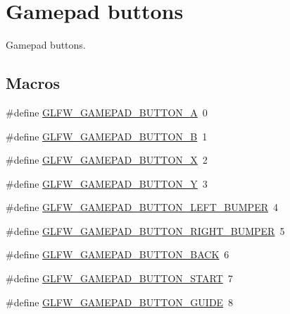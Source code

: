 \hypertarget{group__gamepad__buttons}{}\section{Gamepad buttons}
\label{group__gamepad__buttons}


Gamepad buttons.  


\subsection*{Macros}
\begin{DoxyCompactItemize}
\item 
\#define \mbox{\hyperlink{group__gamepad__buttons_gae055a12fbf4b48b5954c8e1cd129b810}{G\+L\+F\+W\+\_\+\+G\+A\+M\+E\+P\+A\+D\+\_\+\+B\+U\+T\+T\+O\+N\+\_\+A}}~0
\item 
\#define \mbox{\hyperlink{group__gamepad__buttons_ga2228a6512fd5950cdb51ba07846546fa}{G\+L\+F\+W\+\_\+\+G\+A\+M\+E\+P\+A\+D\+\_\+\+B\+U\+T\+T\+O\+N\+\_\+B}}~1
\item 
\#define \mbox{\hyperlink{group__gamepad__buttons_ga52cc94785cf3fe9a12e246539259887c}{G\+L\+F\+W\+\_\+\+G\+A\+M\+E\+P\+A\+D\+\_\+\+B\+U\+T\+T\+O\+N\+\_\+X}}~2
\item 
\#define \mbox{\hyperlink{group__gamepad__buttons_gafc931248bda494b530cbe057f386a5ed}{G\+L\+F\+W\+\_\+\+G\+A\+M\+E\+P\+A\+D\+\_\+\+B\+U\+T\+T\+O\+N\+\_\+Y}}~3
\item 
\#define \mbox{\hyperlink{group__gamepad__buttons_ga17d67b4f39a39d6b813bd1567a3507c3}{G\+L\+F\+W\+\_\+\+G\+A\+M\+E\+P\+A\+D\+\_\+\+B\+U\+T\+T\+O\+N\+\_\+\+L\+E\+F\+T\+\_\+\+B\+U\+M\+P\+ER}}~4
\item 
\#define \mbox{\hyperlink{group__gamepad__buttons_gadfbc9ea9bf3aae896b79fa49fdc85c7f}{G\+L\+F\+W\+\_\+\+G\+A\+M\+E\+P\+A\+D\+\_\+\+B\+U\+T\+T\+O\+N\+\_\+\+R\+I\+G\+H\+T\+\_\+\+B\+U\+M\+P\+ER}}~5
\item 
\#define \mbox{\hyperlink{group__gamepad__buttons_gabc7c0264ce778835b516a472b47f6caf}{G\+L\+F\+W\+\_\+\+G\+A\+M\+E\+P\+A\+D\+\_\+\+B\+U\+T\+T\+O\+N\+\_\+\+B\+A\+CK}}~6
\item 
\#define \mbox{\hyperlink{group__gamepad__buttons_ga04606949dd9139434b8a1bedf4ac1021}{G\+L\+F\+W\+\_\+\+G\+A\+M\+E\+P\+A\+D\+\_\+\+B\+U\+T\+T\+O\+N\+\_\+\+S\+T\+A\+RT}}~7
\item 
\#define \mbox{\hyperlink{group__gamepad__buttons_ga7fa48c32e5b2f5db2f080aa0b8b573dc}{G\+L\+F\+W\+\_\+\+G\+A\+M\+E\+P\+A\+D\+\_\+\+B\+U\+T\+T\+O\+N\+\_\+\+G\+U\+I\+DE}}~8

\end{DoxyCompactItemize}
